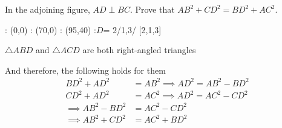 

\question[2]  In the adjoining figure, $AD \perp BC$. Prove that $AB^2+CD^2=BD^2+AC^2$.

: (0,0)
: (70,0)
: (95,40)
:$D$= 2/1,3/
\figdrawbegin{}
  \figdrawline [1,2,3,1]
   [2,1,3]
\figdrawend
{}
\vspace{0.5cm}
\centerline{\box\figBoxA}

\begin{solution}[\halfpage]
	$\bigtriangleup ABD$ and $\bigtriangleup ACD$ are both right-angled triangles
	
	And therefore, the following holds for them	
	\begin{align}
		BD^2 + AD^2 &= AB^2 \implies AD^2 = AB^2-BD^2 \\
		CD^2 + AD^2 &= AC^2 \implies AD^2 = AC^2 - CD^2 \\
		\implies AB^2-BD^2 &= AC^2-CD^2 \\
		\implies AB^2+CD^2 &= AC^2 + BD^2
	\end{align}
\end{solution}
